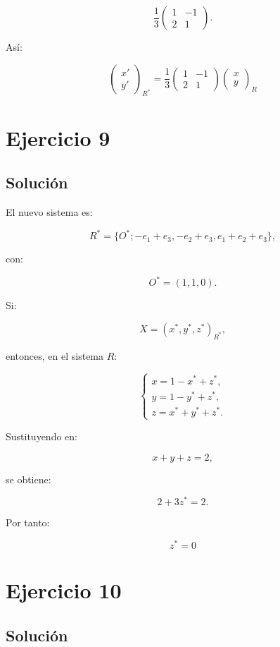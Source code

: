 \documentclass[11pt,a4paper]{article}
\begin{document}
\[
\frac13
\begin{pmatrix}
1&-1\\
2&1
\end{pmatrix}.
\]

Así:

\[
\boxed{
\begin{pmatrix}
x'\\
y'
\end{pmatrix}_{R^*}
=
\frac13
\begin{pmatrix}
1&-1\\
2&1
\end{pmatrix}
\begin{pmatrix}
x\\
y
\end{pmatrix}_{R}
}
\]

\section{Ejercicio 9}
\subsection{Solución}

El nuevo sistema es:

\[
R^*
=
\{O^*;-e_1+e_3,-e_2+e_3,e_1+e_2+e_3\},
\]

con:

\[
O^*=(1,1,0).
\]

Si:

\[
X=(x^*,y^*,z^*)_{R^*},
\]

entonces, en el sistema \(R\):

\[
\begin{cases}
x=1-x^*+z^*,\\
y=1-y^*+z^*,\\
z=x^*+y^*+z^*.
\end{cases}
\]

Sustituyendo en:

\[
x+y+z=2,
\]

se obtiene:

\[
2+3z^*=2.
\]

Por tanto:

\[
\boxed{
z^*=0
}
\]

\section{Ejercicio 10}
\subsection{Solución}
\end{document}
